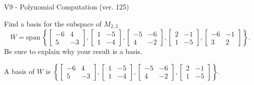 \begin{exercise}
  \begin{exerciseTitle}V9 - Polynomial Computation (ver. 125)\end{exerciseTitle}
  \begin{exerciseStatement}
    Find a basis for the subspace of \(M_{2,2}\) 
\[W=\mathrm{span}\ \left\{\left[\begin{array}{cc}
-6 & 4 \\
5 & -3
\end{array}\right] , \left[\begin{array}{cc}
1 & -5 \\
1 & -4
\end{array}\right] , \left[\begin{array}{cc}
-5 & -6 \\
4 & -2
\end{array}\right] , \left[\begin{array}{cc}
2 & -1 \\
1 & -5
\end{array}\right] , \left[\begin{array}{cc}
-6 & -1 \\
3 & 2
\end{array}\right]\right\}.\]
 Be sure to explain why your result is a basis.


  \end{exerciseStatement}
  \begin{exerciseAnswer}
   A basis of \(W\) is  \(\left\{\left[\begin{array}{cc}
-6 & 4 \\
5 & -3
\end{array}\right] , \left[\begin{array}{cc}
1 & -5 \\
1 & -4
\end{array}\right] , \left[\begin{array}{cc}
-5 & -6 \\
4 & -2
\end{array}\right] , \left[\begin{array}{cc}
2 & -1 \\
1 & -5
\end{array}\right]\right\}\).
  


  \end{exerciseAnswer}
\end{exercise}